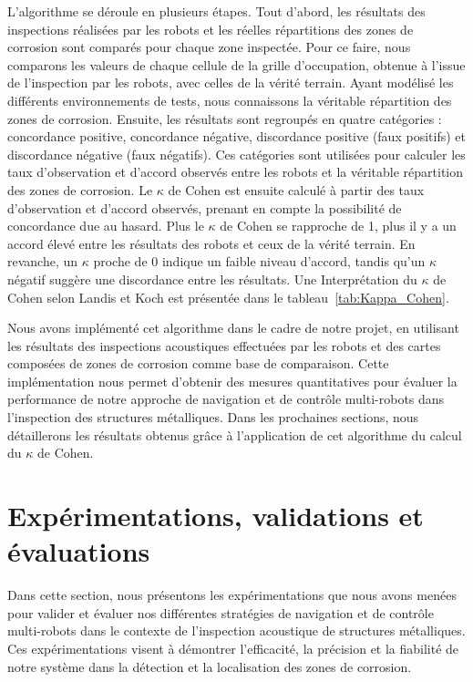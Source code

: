 \documentclass[english,RandD]{rapportPFE}  %
\begin{document}
			L'algorithme se déroule en plusieurs étapes.
			Tout d'abord, les résultats des inspections réalisées par les robots et les réelles répartitions des zones de corrosion sont comparés pour chaque zone inspectée.
			Pour ce faire, nous comparons les valeurs de chaque cellule de la grille d'occupation, obtenue à l'issue de l'inspection par les robots, avec celles de la vérité terrain.
			Ayant modélisé les différents environnements de tests, nous connaissons la véritable répartition des zones de corrosion.
			Ensuite, les résultats sont regroupés en quatre catégories : concordance positive, concordance négative, discordance positive (faux positifs) et discordance négative (faux négatifs).
			Ces catégories sont utilisées pour calculer les taux d'observation et d'accord observés entre les robots et la véritable répartition des zones de corrosion.
			Le $\kappa$ de Cohen est ensuite calculé à partir des taux d'observation et d'accord observés, prenant en compte la possibilité de concordance due au hasard.
			Plus le $\kappa$ de Cohen se rapproche de 1, plus il y a un accord élevé entre les résultats des robots et ceux de la vérité terrain.
			En revanche, un $\kappa$ proche de 0 indique un faible niveau d'accord, tandis qu'un $\kappa$ négatif suggère une discordance entre les résultats.
			Une Interprétation du $\kappa$ de Cohen selon Landis et Koch est présentée dans le tableau~\ref{tab:Kappa_Cohen}.

			Nous avons implémenté cet algorithme dans le cadre de notre projet, en utilisant les résultats des inspections acoustiques effectuées par les robots et des cartes composées de zones de corrosion comme base de comparaison.
			Cette implémentation nous permet d'obtenir des mesures quantitatives pour évaluer la performance de notre approche de navigation et de contrôle multi-robots dans l'inspection des structures métalliques.
			Dans les prochaines sections, nous détaillerons les résultats obtenus grâce à l'application de cet algorithme du calcul du $\kappa$ de Cohen.
	\section{Expérimentations, validations et évaluations}
		Dans cette section, nous présentons les expérimentations que nous avons menées pour valider et évaluer nos différentes stratégies de navigation et de contrôle multi-robots dans le contexte de l'inspection acoustique de structures métalliques.
		Ces expérimentations visent à démontrer l'efficacité, la précision et la fiabilité de notre système dans la détection et la localisation des zones de corrosion.
\end{document}
